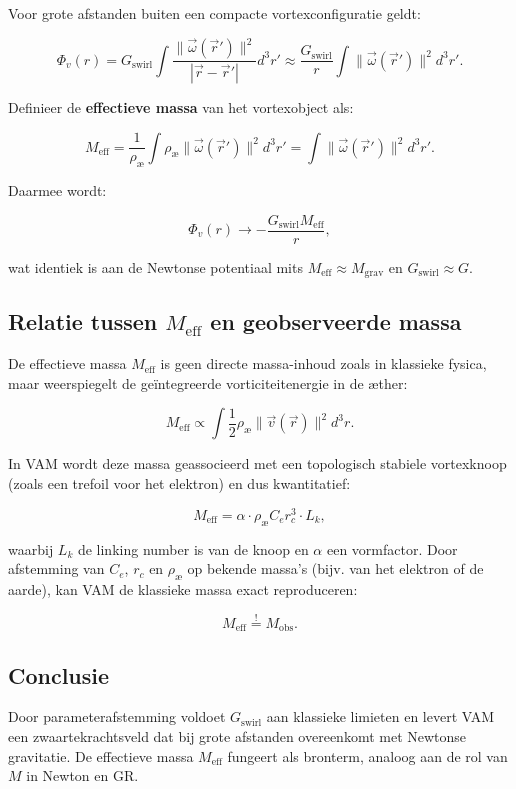 Voor grote afstanden buiten een compacte vortexconfiguratie geldt:

\begin{equation}
\Phi_v(r) = G_{\text{swirl}} \int \frac{\|\vec{\omega}(\vec{r}')\|^2}{|\vec{r} - \vec{r}'|} d^3r' \approx \frac{G_{\text{swirl}}}{r} \int \|\vec{\omega}(\vec{r}')\|^2 d^3r'.
\end{equation}

Definieer de \textbf{effectieve massa} van het vortexobject als:

\begin{equation}
M_{\text{eff}} = \frac{1}{\rho_{\text{æ}}} \int \rho_{\text{æ}} \|\vec{\omega}(\vec{r}')\|^2 d^3r' = \int \|\vec{\omega}(\vec{r}')\|^2 d^3r'.
\end{equation}

Daarmee wordt:

\begin{equation}
\Phi_v(r) \to -\frac{G_{\text{swirl}} M_{\text{eff}}}{r},
\end{equation}

wat identiek is aan de Newtonse potentiaal mits $M_{\text{eff}} \approx M_{\text{grav}}$ en $G_{\text{swirl}} \approx G$.

\subsection{Relatie tussen $M_{\text{eff}}$ en geobserveerde massa}

De effectieve massa $M_{\text{eff}}$ is geen directe massa-inhoud zoals in klassieke fysica, maar weerspiegelt de geïntegreerde vorticiteitenergie in de æther:

\begin{equation}
M_{\text{eff}} \propto \int \frac{1}{2} \rho_{\text{æ}} \|\vec{v}(\vec{r})\|^2 d^3r.
\end{equation}

In VAM wordt deze massa geassocieerd met een topologisch stabiele vortexknoop (zoals een trefoil voor het elektron) en dus kwantitatief:

\begin{equation}
M_{\text{eff}} = \alpha \cdot \rho_{\text{æ}} C_e r_c^3 \cdot L_k,
\end{equation}

waarbij $L_k$ de linking number is van de knoop en $\alpha$ een vormfactor. Door afstemming van $C_e$, $r_c$ en $\rho_{\text{æ}}$ op bekende massa’s (bijv. van het elektron of de aarde), kan VAM de klassieke massa exact reproduceren:

\begin{equation}
M_{\text{eff}} \overset{!}{=} M_{\text{obs}}.
\end{equation}

\subsection{Conclusie}

Door parameterafstemming voldoet $G_{\text{swirl}}$ aan klassieke limieten en levert VAM een zwaartekrachtsveld dat bij grote afstanden overeenkomt met Newtonse gravitatie. De effectieve massa $M_{\text{eff}}$ fungeert als bronterm, analoog aan de rol van $M$ in Newton en GR.

